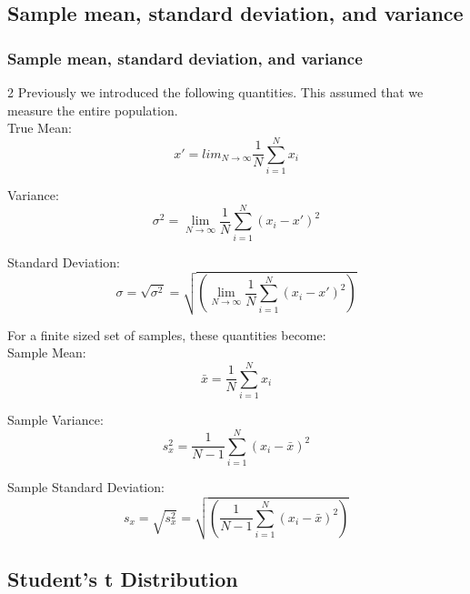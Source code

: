 \documentclass[fleqn]{ltx-talk} %
\newcommand{\sectionIVsubsectionItitle}{Sample mean, standard deviation, and variance}
\newcommand{\sectionIVsubsectionIItitle}{Student's t Distribution}
\begin{document}
		\subsection{\sectionIVsubsectionItitle}\label{sectionIVsubsectionI}

			\begin{frame}
				\frametitle{\sectionIVsubsectionItitle}
        
        \begin{multicols}{2}	
				\scriptsize
        Previously we introduced the following quantities. This assumed that we measure the entire population.\vspace{2mm}\\
        
        True Mean:
        \[x'= lim_{N\rightarrow\infty}\frac{1}{N}\sum\limits_{i=1}^N x_i \]

				Variance:
				\[ \sigma^2=\lim\limits_{N\rightarrow \infty}\frac{1}{N}\sum\limits_{i=1}^{N}(x_i-x')^2 \]
				
        Standard Deviation:
        \[\sigma=\sqrt{\sigma^2}=\sqrt{\left( \lim\limits_{N\rightarrow \infty}\frac{1}{N}\sum\limits_{i=1}^{N}(x_i-x')^2\right)}\]

        For a finite sized set of samples, these quantities become:\vspace{2mm}\\

        Sample Mean:
        \[\bar{x}= \frac{1}{N}\sum\limits_{i=1}^N x_i \]

				Sample Variance:
				\[s_x^2=\frac{1}{N-1}\sum\limits_{i=1}^{N}(x_i-\bar{x})^2 \]
				
        Sample Standard Deviation:
        \[s_x=\sqrt{s_x^2}=\sqrt{\left(\frac{1}{N-1}\sum\limits_{i=1}^{N}(x_i-\bar{x})^2 \right)}\]
        \end{multicols}

			\end{frame}

		\subsection{\sectionIVsubsectionIItitle}\label{sectionIVsubsectionII}	
		
\end{document}
